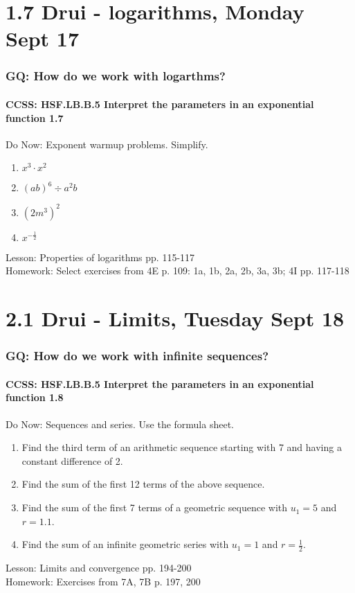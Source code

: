 \documentclass{beamer}
\begin{document}
\section{1.7 Drui - logarithms, Monday Sept 17}
  \frame
  {
    \frametitle{GQ: How do we work with logarthms?}
    \framesubtitle{CCSS: HSF.LB.B.5 Interpret the parameters in an exponential function  \alert{1.7}}

    \begin{block}{Do Now: Exponent warmup problems. Simplify.}
      \begin{enumerate}
      \item $x^3 \cdot x^2$
      \item $(ab)^6 \div a^2 b$
      \item $(2m^3)^2$
      \item $\displaystyle x^{-\frac{1}{2}}$
      \end{enumerate}
   \end{block}
    Lesson: Properties of logarithms pp. 115-117\\ \bigskip
    Homework: Select exercises from 4E p. 109: 1a, 1b, 2a, 2b, 3a, 3b; 4I pp. 117-118
  }

\section{2.1 Drui - Limits, Tuesday Sept 18}
  \frame
  {
    \frametitle{GQ: How do we work with infinite sequences?}
    \framesubtitle{CCSS: HSF.LB.B.5 Interpret the parameters in an exponential function  \alert{1.8}}

    \begin{block}{Do Now: Sequences and series. Use the formula sheet.}
      \begin{enumerate}
      \item Find the third term of an arithmetic sequence starting with 7 and having a constant difference of 2.
      \item Find the sum of the first 12 terms of the above sequence.
      \item Find the sum of the first 7 terms of a geometric sequence with $u_1=5$ and $r=1.1$.
      \item Find the sum of an infinite geometric series with $u_1=1$ and $r=\frac{1}{2}$.
      \end{enumerate}
   \end{block}
    Lesson: Limits and convergence pp. 194-200\\ \bigskip
    Homework: Exercises from 7A, 7B p. 197, 200
  }
\end{document}
